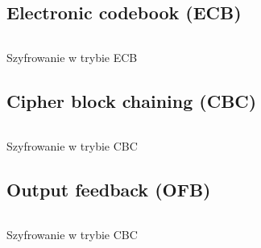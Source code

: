 \documentclass[12pt]{article}
\begin{document}
\subsection{Electronic codebook (ECB)}

\begin{listing}[H]
	\inputminted[firstline=113,lastline=133]{python}{../aes.py}
	\caption{Szyfrowanie w trybie ECB}
\end{listing}

\subsection{Cipher block chaining (CBC)}

\begin{listing}[H]
	\inputminted[firstline=135,lastline=162]{python}{../aes.py}
	\caption{Szyfrowanie w trybie CBC}
\end{listing}

\subsection{Output feedback (OFB)}

\begin{listing}[H]
	\inputminted[firstline=164,lastline=185]{python}{../aes.py}
	\caption{Szyfrowanie w trybie CBC}
\end{listing}
\end{document}

